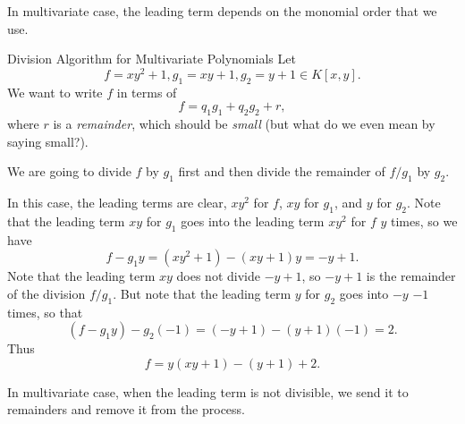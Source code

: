 \documentclass[co439]{subfiles}
\begin{document}
    \rruleline

    \np In multivariate case, the leading term depends on the monomial order that we use.

    \begin{example}{Division Algorithm for Multivariate Polynomials}
        Let
        \begin{equation*}
            f = xy^{2} + 1 , g_1 = xy+1, g_2 = y+1 \in K\left[ x,y \right].
        \end{equation*}
        We want to write $f$ in terms of
        \begin{equation*}
            f = q_1g_1 + q_2g_2 + r,
        \end{equation*}
        where $r$ is a \textit{remainder}, which should be \textit{small} (but what do we even mean by saying small?).

        We are going to divide $f$ by $g_1$ first and then divide the remainder of $f /g_1$ by $g_2$.

        In this case, the leading terms are clear, $xy^{2}$ for $f$, $xy$ for $g_1$, and $y$ for $g_2$. Note that the leading term $xy$ for $g_1$ goes into the leading term $xy^{2}$ for $f$ $y$ times, so we have
        \begin{equation*}
            f - g_1y = \left( xy^{2}+1 \right) - \left( xy+1 \right)y = -y+1.
        \end{equation*}
        Note that the leading term $xy$ does not divide $-y+1$, so $-y+1$ is the remainder of the division $f /g_1$. But note that the leading term $y$ for $g_2$ goes into $-y$ $-1$ times, so that
        \begin{equation*}
            \left( f-g_1y \right) - g_2\left( -1 \right) = \left( -y+1 \right) - \left( y+1 \right)\left( -1 \right) = 2.
        \end{equation*}
        Thus
        \begin{equation*}
            f = y\left( xy+1 \right) - \left( y+1 \right) + 2.
        \end{equation*}
    \end{example}

    \rruleline

    \np In multivariate case, when the leading term is not divisible, we send it to remainders and remove it from the process.
    
\end{document}

